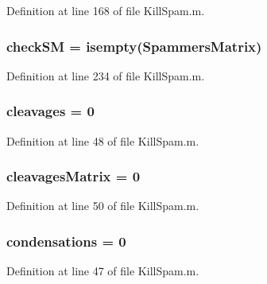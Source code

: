 Definition at line 168 of file Kill\+Spam.\+m.

\hypertarget{a00029_ae80cf4c5bf659247b45bbad5d22dec52}{
\subsubsection[{check\+S\+M}]{ check\+S\+M = {\bf isempty}({\bf Spammers\+Matrix})}}\label{a00029_ae80cf4c5bf659247b45bbad5d22dec52}


Definition at line 234 of file Kill\+Spam.\+m.

\hypertarget{a00029_a89060c6979e5a4ff7b0985b35f295695}{
\subsubsection[{cleavages}]{\setlength{\rightskip}{0pt plus 5cm}cleavages = 0}}\label{a00029_a89060c6979e5a4ff7b0985b35f295695}


Definition at line 48 of file Kill\+Spam.\+m.

\hypertarget{a00029_a1a691fb4f955887edfa538e91479fafe}{
\subsubsection[{cleavages\+Matrix}]{\setlength{\rightskip}{0pt plus 5cm}cleavages\+Matrix = 0}}\label{a00029_a1a691fb4f955887edfa538e91479fafe}


Definition at line 50 of file Kill\+Spam.\+m.

\hypertarget{a00029_ad3aa27d88a7e9d77d8334155860269bb}{
\subsubsection[{condensations}]{ condensations = 0}}\label{a00029_ad3aa27d88a7e9d77d8334155860269bb}


Definition at line 47 of file Kill\+Spam.\+m.


